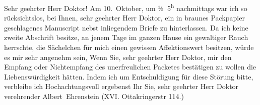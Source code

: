 \pstart{}Sehr geehrter Herr Doktor!\pend\vspace{0.5em}
\pstart
           Am 10. Oktober, um ½ 5\textsuperscript{h} nachmittags war ich so rücksichtslos, bei Ihnen, sehr geehrter Herr Doktor,
               ein in braunes Packpapier geschlagenes Manuscript nebst inliegendem Briefe zu hinterlassen. Da ich
               keine zweite Abschrift besitze, an jenem Tage im ganzen Hause ein gewaltiger Rauch
               herrschte, die Sächelchen für mich einen gewissen Affektionswert besitzen, würde es
               mir sehr angenehm sein, Wenn Sie, sehr geehrter Herr
               Doktor, {\pb}mir den Empfang oder Nichtempfang
               des unerfreulichen Packetes bestätigen zu wollen die Liebenswürdigkeit hätten. Indem
               ich um Entschuldigung für diese Störung bitte, verbleibe ich Hochachtungsvoll
               ergebenst Ihr Sie, sehr geehrter Herr Doktor verehrender\pend
           \pstart \spacefill\mbox{Albert Ehrenstein}\pend{}
\pstart
           \noindent{}(XVI. Ottakringerstr 114.)\pend
           \endnumbering{}  \newcommand{\dateiname}{L01793}\newcommand{\titel}{Albert Ehrenstein an Arthur Schnitzler, 20. 10. 1908}\newcommand{\editorInnen}{Martin Anton Müller und Gerd-Hermann Susen}

